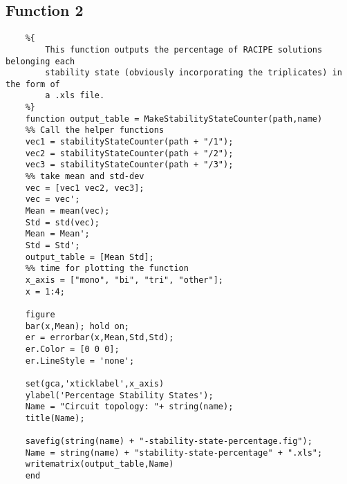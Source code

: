 \documentclass{article}
\begin{document}
\subsection*{Function 2}
\begin{verbatim}
    %{
        This function outputs the percentage of RACIPE solutions belonging each 
        stability state (obviously incorporating the triplicates) in the form of 
        a .xls file. 
    %}
    function output_table = MakeStabilityStateCounter(path,name)
    %% Call the helper functions
    vec1 = stabilityStateCounter(path + "/1");
    vec2 = stabilityStateCounter(path + "/2");
    vec3 = stabilityStateCounter(path + "/3");
    %% take mean and std-dev 
    vec = [vec1 vec2, vec3];
    vec = vec';
    Mean = mean(vec);
    Std = std(vec);
    Mean = Mean';
    Std = Std';
    output_table = [Mean Std];
    %% time for plotting the function
    x_axis = ["mono", "bi", "tri", "other"];
    x = 1:4;
    
    figure
    bar(x,Mean); hold on;
    er = errorbar(x,Mean,Std,Std);    
    er.Color = [0 0 0];                            
    er.LineStyle = 'none';  
    
    set(gca,'xticklabel',x_axis)
    ylabel('Percentage Stability States');
    Name = "Circuit topology: "+ string(name);
    title(Name);
    
    savefig(string(name) + "-stability-state-percentage.fig");
    Name = string(name) + "stability-state-percentage" + ".xls";
    writematrix(output_table,Name)
    end
\end{verbatim}
\end{document}
